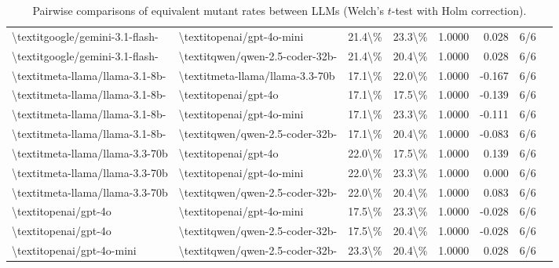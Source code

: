 \begin{table}[htbp]
{\begin{tabular}{ll|rrrrrl}
\textbackslash{}textit{google/gemini-3.1-flash-} & \textbackslash{}textit{openai/gpt-4o-mini} & 21.4\textbackslash{}\% & 23.3\textbackslash{}\% & 1.0000 & 0.028 & 6/6 \\
\textbackslash{}textit{google/gemini-3.1-flash-} & \textbackslash{}textit{qwen/qwen-2.5-coder-32b-} & 21.4\textbackslash{}\% & 20.4\textbackslash{}\% & 1.0000 & 0.028 & 6/6 \\
\textbackslash{}textit{meta-llama/llama-3.1-8b-} & \textbackslash{}textit{meta-llama/llama-3.3-70b} & 17.1\textbackslash{}\% & 22.0\textbackslash{}\% & 1.0000 & -0.167 & 6/6 \\
\textbackslash{}textit{meta-llama/llama-3.1-8b-} & \textbackslash{}textit{openai/gpt-4o} & 17.1\textbackslash{}\% & 17.5\textbackslash{}\% & 1.0000 & -0.139 & 6/6 \\
\textbackslash{}textit{meta-llama/llama-3.1-8b-} & \textbackslash{}textit{openai/gpt-4o-mini} & 17.1\textbackslash{}\% & 23.3\textbackslash{}\% & 1.0000 & -0.111 & 6/6 \\
\textbackslash{}textit{meta-llama/llama-3.1-8b-} & \textbackslash{}textit{qwen/qwen-2.5-coder-32b-} & 17.1\textbackslash{}\% & 20.4\textbackslash{}\% & 1.0000 & -0.083 & 6/6 \\
\textbackslash{}textit{meta-llama/llama-3.3-70b} & \textbackslash{}textit{openai/gpt-4o} & 22.0\textbackslash{}\% & 17.5\textbackslash{}\% & 1.0000 & 0.139 & 6/6 \\
\textbackslash{}textit{meta-llama/llama-3.3-70b} & \textbackslash{}textit{openai/gpt-4o-mini} & 22.0\textbackslash{}\% & 23.3\textbackslash{}\% & 1.0000 & 0.000 & 6/6 \\
\textbackslash{}textit{meta-llama/llama-3.3-70b} & \textbackslash{}textit{qwen/qwen-2.5-coder-32b-} & 22.0\textbackslash{}\% & 20.4\textbackslash{}\% & 1.0000 & 0.083 & 6/6 \\
\textbackslash{}textit{openai/gpt-4o} & \textbackslash{}textit{openai/gpt-4o-mini} & 17.5\textbackslash{}\% & 23.3\textbackslash{}\% & 1.0000 & -0.028 & 6/6 \\
\textbackslash{}textit{openai/gpt-4o} & \textbackslash{}textit{qwen/qwen-2.5-coder-32b-} & 17.5\textbackslash{}\% & 20.4\textbackslash{}\% & 1.0000 & -0.028 & 6/6 \\
\textbackslash{}textit{openai/gpt-4o-mini} & \textbackslash{}textit{qwen/qwen-2.5-coder-32b-} & 23.3\textbackslash{}\% & 20.4\textbackslash{}\% & 1.0000 & 0.028 & 6/6 \\
\bottomrule
\end{tabular}
}
\caption{Pairwise comparisons of equivalent mutant rates between LLMs (Welch's $t$-test with Holm correction).}
\label{tab:llm-equiv-stats}
\end{table}